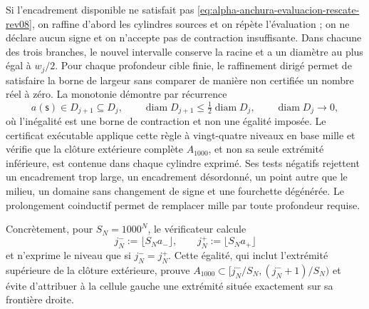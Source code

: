Si l'encadrement disponible ne satisfait pas \eqref{eq:alpha-anchura-evaluacion-rescate-rev08}, on raffine d'abord les cylindres sources et on répète l'évaluation ; on ne déclare aucun signe et on n'accepte pas de contraction insuffisante. Dans chacune des trois branches, le nouvel intervalle conserve la racine et a un diamètre au plus égal à \(w_j/2\). Pour chaque profondeur cible finie, le raffinement dirigé permet de satisfaire la borne de largeur sans comparer de manière non certifiée un nombre réel à zéro. La monotonie démontre par récurrence
\begin{equation}
 a(\mathsf s)\in D_{j+1}\subseteq D_j,\qquad
 \operatorname{diam}D_{j+1}\leq
 \tfrac12\operatorname{diam}D_j,
 \qquad \operatorname{diam}D_j\longrightarrow0,
 \label{eq:alpha-biseccion-racional}
\end{equation}
où l'inégalité est une borne de contraction et non une égalité imposée.
Le certificat exécutable applique
cette règle à vingt-quatre niveaux en base mille et vérifie que la clôture
extérieure complète \(A_{1000}\), et non sa seule extrémité inférieure, est contenue dans
chaque cylindre exprimé. Ses tests négatifs rejettent un encadrement trop
large, un encadrement désordonné, un point autre que le milieu, un domaine sans
changement de signe et une fourchette dégénérée. Le prolongement coinductif permet
de remplacer mille par toute profondeur requise.

Concrètement, pour \(S_N=1000^N\), le vérificateur calcule
\begin{equation}
 j_N^-:=\lfloor S_Na_-\rfloor,
 \qquad j_N^+:=\lfloor S_Na_+\rfloor
 \label{eq:alpha-indices-cilindro-dirigidos-rev08}
\end{equation}
et n'exprime le niveau que si \(j_N^-=j_N^+\). Cette égalité, qui inclut
l'extrémité supérieure de la clôture extérieure, prouve
\(A_{1000}\subset[j_N^-/S_N,(j_N^-+1)/S_N)\) et évite d'attribuer à la cellule
gauche une extrémité située exactement sur sa frontière droite.

